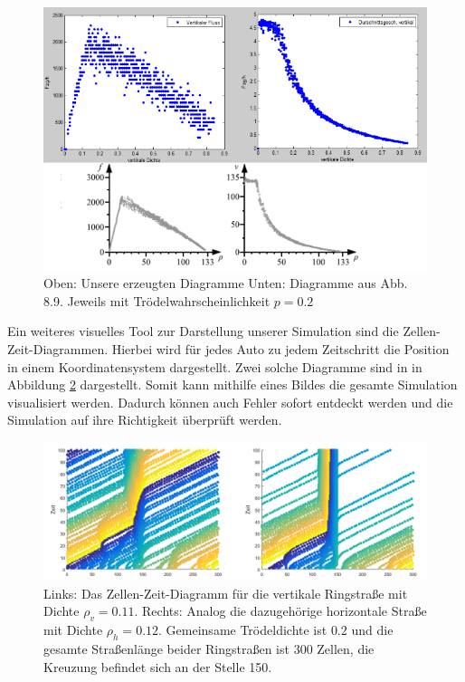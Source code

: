 \begin{figure}[H]%
\centering
\includegraphics[width=12cm]{4_FD_Vergleich.png}%
\caption[Fundamentaldiagramm]{Oben: Unsere erzeugten Diagramme Unten: Diagramme aus \cite{book:bungartz} Abb. 8.9. Jeweils mit Trödelwahrscheinlichkeit $p=0.2$}%
\label{pic:FD_Vergleich}%
\end{figure} 
\noindent
Ein weiteres visuelles Tool zur Darstellung unserer Simulation sind die Zellen-Zeit-Diagrammen. Hierbei wird für jedes Auto zu jedem Zeitschritt die Position in einem Koordinatensystem dargestellt. Zwei solche Diagramme sind in in Abbildung \ref{pic:ZelleZeit} dargestellt. Somit kann mithilfe eines Bildes die gesamte Simulation visualisiert werden. Dadurch können auch Fehler sofort entdeckt werden und die Simulation auf ihre Richtigkeit überprüft werden. 
\begin{figure}[H]%
\centering
\includegraphics[width=15cm]{4_ZelleZeit.png}%
\caption[Zellen-Zeit-Diagramm]{Links: Das Zellen-Zeit-Diagramm für die vertikale Ringstraße mit Dichte $\rho_v = 0.11$. Rechts: Analog die dazugehörige horizontale Straße mit Dichte $\rho_h=0.12$. Gemeinsame Trödeldichte ist $0.2$ und die gesamte Straßenlänge beider Ringstraßen ist $300$ Zellen, die Kreuzung befindet sich an der Stelle 150.  }%
\label{pic:ZelleZeit}%
\end{figure}
